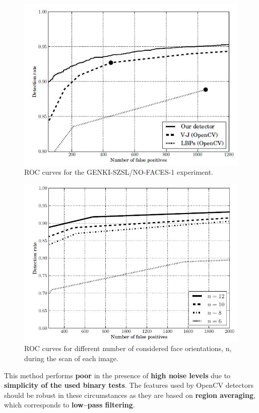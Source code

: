 \documentclass[a4paper,12pt]{article}
\begin{document}
\begin{figure}[h!]
  \centering
  \includegraphics[width=\textwidth, keepaspectratio=true]{ObjectDetectionPixelIntensityFig2.jpg}
  \caption{ROC curves for the GENKI-SZSL/NO-FACES-1 experiment.}
 \label{fig:fig2}
\end{figure}


\begin{figure}[h!]
  \centering
  \includegraphics[width=\textwidth, keepaspectratio=true]{ObjectDetectionPixelIntensityFig7.jpg}
  \caption{ROC curves for different number of considered face orientations, n, during the scan of each image.}
 \label{fig:fig7}
\end{figure}

This method performs \textbf{poor} in the presence of \textbf{high noise levels} due to 
\textbf{simplicity of the used binary tests}. The features used by OpenCV detectors should be robust in these circumstances as they are based on \textbf{region averaging}, which corresponds to \textbf{low--pass filtering}. 
\end{document}
